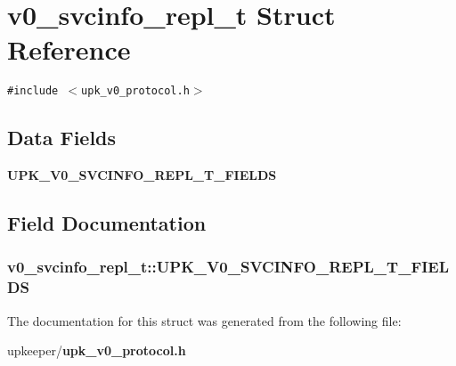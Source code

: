 \section{v0\_\-svcinfo\_\-repl\_\-t Struct Reference}
\label{structv0__svcinfo__repl__t}
{\tt \#include $<$upk\_\-v0\_\-protocol.h$>$}

\subsection*{Data Fields}
\begin{CompactItemize}
\item 
\bf{UPK\_\-V0\_\-SVCINFO\_\-REPL\_\-T\_\-FIELDS}
\end{CompactItemize}


\subsection{Field Documentation}
\subsubsection{\setlength{\rightskip}{0pt plus 5cm}\bf{v0\_\-svcinfo\_\-repl\_\-t::UPK\_\-V0\_\-SVCINFO\_\-REPL\_\-T\_\-FIELDS}}\label{structv0__svcinfo__repl__t_fe6052fcde755f40c7b6cc45451fc6df}




The documentation for this struct was generated from the following file:\begin{CompactItemize}
\item 
upkeeper/\bf{upk\_\-v0\_\-protocol.h}\end{CompactItemize}
